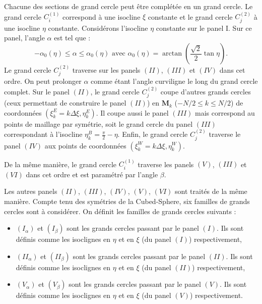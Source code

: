 Chacune des sections de grand cercle peut être complétée en un grand cercle. Le grand cercle $C_i^{(1)}$ correspond à une isocline $\xi$ constante et le grand cercle $C_j^{(2)}$ à une isocline $\eta$ constante. Considérons l'isocline $\eta$ constante sur le panel I. Sur ce panel, l'angle $\alpha$ est tel que :
\begin{equation}
- \alpha_0 (\eta) \leq \alpha \leq \alpha_0(\eta) \text{ avec } \alpha_0( \eta) = \arctan \left( \dfrac{\sqrt{2}}{2} \tan \eta \right).
\end{equation}
Le grand cercle $C_j^{(2)}$ traverse sur les panels $(II)$, $(III)$ et $(IV)$ dans cet ordre. On peut prolonger $\alpha$ comme étant l'angle curviligne le long du grand cercle complet. Sur le panel $(II)$, le grand cercle $C_j^{(2)}$ coupe d'autres grands cercles (ceux permettant de construire le panel $(II)$) en $\mathbf{M}_k$ ($-N/2 \leq k \leq N/2$) de coordonnées $(\xi^E_k = k \Delta \xi, \eta^E_k)$. Il coupe aussi le panel $(III)$ mais correspond au points de maillage par symétrie, soit le grand cercle du panel $(III)$ correspondant à l'isocline $\eta^B_k = \frac{\pi}{2} - \eta$. Enfin, le grand cercle $C_j^{(2)}$ traverse le panel $(IV)$ aux points de coordonnées $(\xi^W_k = k \Delta \xi, \eta^W_k)$. 

De la même manière, le grand cercle $C_i^{(1)}$ traverse les panels $(V)$, $(III)$ et $(VI)$ dans cet ordre et est paramétré par l'angle $\beta$.

Les autres panels $(II)$, $(III)$, $(IV)$, $(V)$, $(VI)$ sont traités de la même manière. Compte tenu des symétries de la Cubed-Sphere, six familles de grands cercles sont à considérer. On définit les familles de grands cercles suivants :

\begin{itemize}
\item $(I_{\alpha})$ et $(I_{\beta})$ sont les grands cercles passant par le panel $(I)$. Ils sont définis comme les isoclignes en $\eta$ et en $\xi$ (du panel $(I)$) respectivement,
\item $(II_{\alpha})$ et $(II_{\beta})$ sont les grands cercles passant par le panel $(II)$. Ils sont définis comme les isoclignes en $\eta$ et en $\xi$ (du panel $(II)$) respectivement,
\item $(V_{\alpha})$ et $(V_{\beta})$ sont les grands cercles passant par le panel $(V)$. Ils sont définis comme les isoclignes en $\eta$ et en $\xi$ (du panel $(V)$) respectivement.
\end{itemize}

